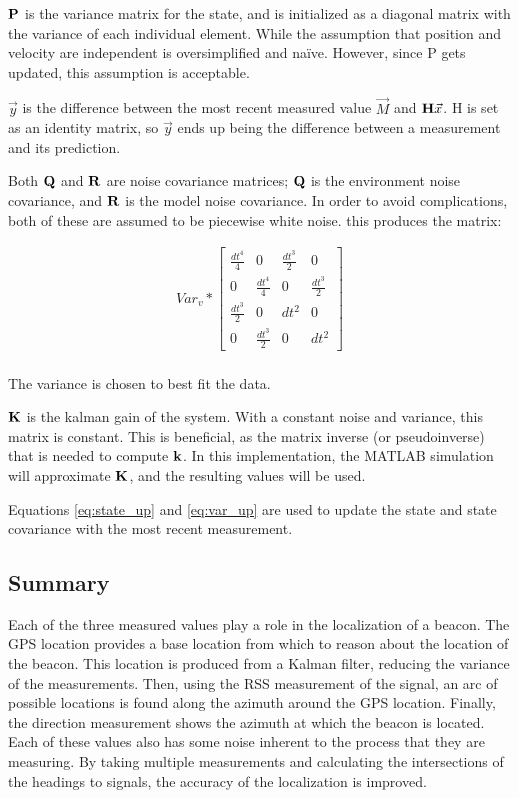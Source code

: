 $\mathbf{P}$ is the variance matrix for the state, and is initialized as a diagonal matrix with the variance of each individual element. While the assumption that position and velocity are independent is oversimplified and na{\"i}ve. However, since P gets updated, this assumption is acceptable. \par
$\vec{y}$ is the difference between the most recent measured value $\vec{M}$ and $\mathbf{H}\vec{x}$. H is set as an identity matrix, so $\vec{y}$ ends up being the difference between a measurement and its prediction. \par
Both $\mathbf{Q}$ and $\mathbf{R}$ are noise covariance matrices; $\mathbf{Q}$ is the environment noise covariance, and $\mathbf{R}$ is the model noise covariance. In order to avoid complications, both of these are assumed to be piecewise white noise. this produces the matrix: 

\begin{align}
Var_v * \begin{bmatrix}\frac{dt^4}{4} & 0 & \frac{dt^3}{2} & 0\\0 & \frac{dt^4}{4} & 0 & \frac{dt^3}{2}\\\frac{dt^3}{2} & 0 & dt^2 & 0 \\ 0 & \frac{dt^3}{2} & 0 & dt^2  \end{bmatrix}
\end{align} \\
The variance is chosen to best fit the data. \par
$\mathbf{K}$ is the kalman gain of the system. With a constant noise and variance, this matrix is constant. This is beneficial, as the matrix inverse (or pseudoinverse) that is needed to compute $\mathbf{k}$. In this implementation, the MATLAB simulation will approximate $\mathbf{K}$, and the resulting values will be used. \par
Equations \ref{eq:state_up} and \ref{eq:var_up} are used to update the state and state covariance with the most recent measurement. 


\subsection{Summary}
Each of the three measured values play a role in the localization of a beacon. The GPS location provides a base location from which to reason about the location of the beacon. This location is produced from a Kalman filter, reducing the variance of the measurements. Then, using the RSS measurement of the signal, an arc of possible locations is found along the azimuth around the GPS location. Finally, the direction measurement shows the azimuth at which the beacon is located. Each of these values also has some noise inherent to the process that they are measuring. By taking multiple measurements and calculating the intersections of the headings to signals, the accuracy of the localization is improved.

